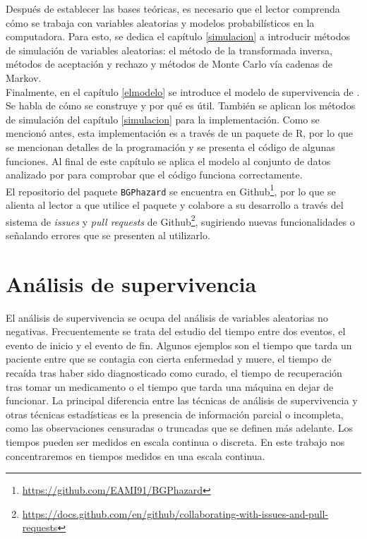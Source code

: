 \documentclass[11pt,a4paper]{article}
\begin{document}
Después de establecer las bases teóricas, es necesario que el lector comprenda cómo se trabaja con variables aleatorias y modelos probabilísticos en la computadora. Para esto, se dedica el capítulo \ref{simulacion} a introducir métodos de simulación de variables aleatorias: el método de la transformada inversa, métodos de aceptación y rechazo y métodos de Monte Carlo vía cadenas de Markov.\\

Finalmente, en el capítulo \ref{elmodelo} se introduce el modelo de supervivencia de \citet{nieto}. Se habla de cómo se construye y por qué es útil. También se aplican los métodos de simulación del capítulo \ref{simulacion} para la implementación. Como se mencionó antes, esta implementación es a través de un paquete de R, por lo que se mencionan detalles de la programación y se presenta el código de algunas funciones. Al final de este capítulo se aplica el modelo al conjunto de datos analizado por \citet{nieto} para comprobar que el código funciona correctamente.\\

El repositorio del paquete \texttt{BGPhazard} \citep{bgphazard} se encuentra en Github\footnote{\url{https://github.com/EAMI91/BGPhazard}}, por lo que se alienta al lector a que utilice el paquete y colabore a su desarrollo a través del sistema de \textit{issues} y \textit{pull requests} de Github\footnote{\url{https://docs.github.com/en/github/collaborating-with-issues-and-pull-requests}}, sugiriendo nuevas funcionalidades  o señalando errores que se presenten al utilizarlo.\\

\newpage

\section{Análisis de supervivencia} \label{analisis_sup}

El análisis de supervivencia se ocupa del análisis de variables aleatorias no negativas. Frecuentemente se trata del estudio del tiempo entre dos eventos, el evento de inicio y el evento de fin. Algunos ejemplos son el tiempo que tarda un paciente entre que se contagia con cierta enfermedad y muere, el tiempo de recaída tras haber sido diagnosticado como curado, el tiempo de recuperación tras tomar un medicamento o el tiempo que tarda una máquina en dejar de funcionar. La principal diferencia entre las técnicas de análisis de supervivencia y otras técnicas estadísticas es la presencia de información parcial o incompleta, como las observaciones censuradas o truncadas que se definen más adelante. Los tiempos pueden ser medidos en escala continua o discreta. En este trabajo nos concentraremos en tiempos medidos en una escala continua.\\
\end{document}
